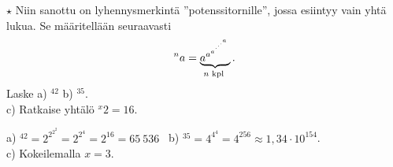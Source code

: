 \begin{tehtavasivu}
\begin{tehtava}
$\star$ Niin sanottu  on lyhennysmerkintä ''potenssitornille'',
jossa esiintyy vain yhtä lukua. Se määritellään seuraavasti
\[^na = \underbrace{{a^{a^{a^{\mathstrut^{.^{.^{.^{a}}}}}}}}}_{n\textrm{ kpl }}. \]
Laske  a) $^42$   b) $^35$. \\ c) Ratkaise yhtälö $^x2= 16$.
\begin{vastaus}
a) $^42 = 2^{2^{2^2}}=2^{2^4}=2^{16}=65\ 536$ \
b) $^35 = 4^{4^4} = 4^{256} \approx 1,34 \cdot 10^{154}$. \\
c) Kokeilemalla $x =3$.
\end{vastaus}
\end{tehtava}

\end{tehtavasivu}
